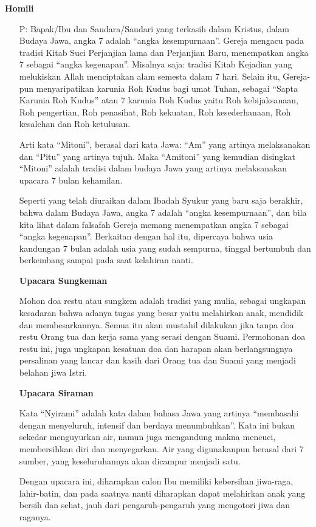 \documentclass[a5paper,headsepline,titlepage,10pt,nnormalheadings,DIVcalc,twoside]{scrbook}
\makeatletter
\newcommand{\subjudul}[1]{%
  {\parindent \z@ 
    \interlinepenalty\@M \bfseries #1\par\nobreak \vskip 10\p@ }}
\newcommand{\BP}[1]{\begin{itemize} \item[P:] #1 \end{itemize}}
\makeatother
\begin{document}
\subjudul{Homili}
\BP{ 
Bapak/Ibu dan Saudara/Saudari yang terkasih dalam Kristus, dalam Budaya Jawa, angka 7 adalah “angka kesempurnaan”. Gereja mengacu pada tradisi Kitab Suci Perjanjian lama dan Perjanjian Baru, menempatkan angka 7 sebagai “angka kegenapan”. Misalnya saja: tradisi Kitab Kejadian yang melukiskan Allah menciptakan alam semesta dalam 7 hari. Selain itu, Gereja-pun menyaripatikan karunia Roh Kudus bagi umat Tuhan, sebagai “Sapta Karunia Roh Kudus” atau 7 karunia Roh Kudus yaitu Roh kebijaksanaan, Roh pengertian, Roh penasihat, Roh kekuatan, Roh kesederhanaan, Roh kesalehan dan Roh ketulusan.

 
Arti kata “Mitoni”, berasal dari kata Jawa: “Am” yang artinya melaksanakan dan “Pitu” yang artinya tujuh. Maka “Amitoni” yang kemudian disingkat “Mitoni” adalah tradisi dalam budaya Jawa yang artinya melaksanakan upacara 7 bulan kehamilan.
 
Seperti yang telah diuraikan dalam Ibadah Syukur yang baru saja berakhir, bahwa dalam Budaya Jawa, angka 7 adalah “angka kesempurnaan”, dan bila kita lihat dalam falsafah Gereja memang menempatkan angka 7 sebagai “angka kegenapan”. Berkaitan dengan hal itu, dipercaya bahwa usia kandungan 7 bulan adalah usia yang sudah sempurna, tinggal bertumbuh dan berkembang sampai pada saat kelahiran nanti.
 
{\bf Upacara Sungkeman}
 
Mohon doa restu atau sungkem adalah tradisi yang mulia, sebagai ungkapan kesadaran bahwa adanya tugas yang besar yaitu melahirkan anak, mendidik dan membesarkannya. Semua itu akan mustahil dilakukan jika tanpa doa restu Orang tua dan kerja sama yang serasi dengan Suami. Permohonan doa restu ini, juga ungkapan kesatuan doa dan harapan akan berlangsungnya persalinan yang lancar dan kasih dari Orang tua dan Suami yang menjadi belahan jiwa Istri.
 
{\bf Upacara Siraman}

Kata “Nyirami” adalah kata dalam bahasa Jawa yang artinya “membasahi dengan menyeluruh, intensif dan berdaya menumbuhkan”. Kata ini bukan sekedar menguyurkan air, namun juga mengandung makna mencuci, membersihkan diri dan menyegarkan. Air yang digunakanpun berasal dari 7 sumber, yang keseluruhannya akan dicampur menjadi satu.
 
Dengan upacara ini, diharapkan calon Ibu memiliki kebersihan jiwa-raga, lahir-batin, dan pada saatnya nanti diharapkan dapat melahirkan anak yang bersih dan sehat, jauh dari pengaruh-pengaruh yang mengotori jiwa dan raganya.
 
}
\end{document}
